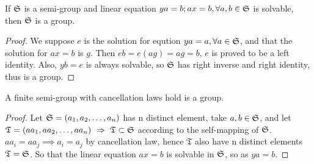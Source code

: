 		\begin{theorem}
		If $\mathfrak{S}$ is a semi-group and linear equation $ya=b; ax=b, \forall a,b\in\mathfrak{S}$ is solvable, then $\mathfrak{S}$ is a group.
		\end{theorem}
		\begin{proof}
		We suppose $e$ is the solution for eqution $ya=a, \forall a\in\mathfrak{S}$, and that the solution for $ax=b$ is $g$. Then $eb=e(ag)=ag=b$, $e$ is proved to be a left identity. Also, $yb=e$ is always solvable, so $\mathfrak{S}$ has right inverse and right identity, thus is a group. 
		\end{proof}
		\begin{theorem}
		A finite semi-group with cancellation laws hold is a group.
		\end{theorem}
		\begin{proof}
		Let $\mathfrak{S}=(a_1, a_2,\dots,a_n)$ has n distinct element, take $a,b\in\mathfrak{S}$, and let $\mathfrak{T}=(aa_1, aa_2,\dots,aa_n)\hbox{$\textrm{ }\Rightarrow\textrm{ }$} \mathfrak{T}\subset\mathfrak{S}$ according to the self-mapping of $\mathfrak{S}$. $aa_i=aa_j\implies a_i=a_j$ by cancellation law, hence $\mathfrak{T}$ also have n distinct elements \implies $\mathfrak{T}=\mathfrak{S}$. So that the linear equation $ax=b$ is solvable in $\mathfrak{S}$, so as $ya=b$.
		\end{proof}
